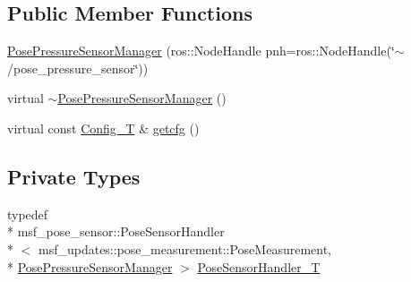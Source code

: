 \subsection*{Public Member Functions}
\begin{DoxyCompactItemize}
\item 
\hyperlink{classmsf__pose__pressure__sensor_1_1PosePressureSensorManager_a28fc095ea4f5b49d331831e5ec469b0d}{Pose\-Pressure\-Sensor\-Manager} (ros\-::\-Node\-Handle pnh=ros\-::\-Node\-Handle(\char`\"{}$\sim$/pose\-\_\-pressure\-\_\-sensor\char`\"{}))
\item 
virtual \hyperlink{classmsf__pose__pressure__sensor_1_1PosePressureSensorManager_a8b79dd9ac066040294c79d77d8cb3207}{$\sim$\-Pose\-Pressure\-Sensor\-Manager} ()
\item 
virtual const \hyperlink{namespacemsf__pose__pressure__sensor_a2c4cfe42f9dab2046f445854ea6e36b8}{Config\-\_\-\-T} \& \hyperlink{classmsf__pose__pressure__sensor_1_1PosePressureSensorManager_a5ba1ee91ddf33a6a95674b59b140289f}{getcfg} ()
\end{DoxyCompactItemize}
\subsection*{Private Types}
\begin{DoxyCompactItemize}
\item 
typedef \\*
msf\-\_\-pose\-\_\-sensor\-::\-Pose\-Sensor\-Handler\\*
$<$ msf\-\_\-updates\-::pose\-\_\-measurement\-::\-Pose\-Measurement, \\*
\hyperlink{classmsf__pose__pressure__sensor_1_1PosePressureSensorManager}{Pose\-Pressure\-Sensor\-Manager} $>$ \hyperlink{classmsf__pose__pressure__sensor_1_1PosePressureSensorManager_a7029a392dc94b00bc153133755f3d410}{Pose\-Sensor\-Handler\-\_\-\-T}
\end{DoxyCompactItemize}

